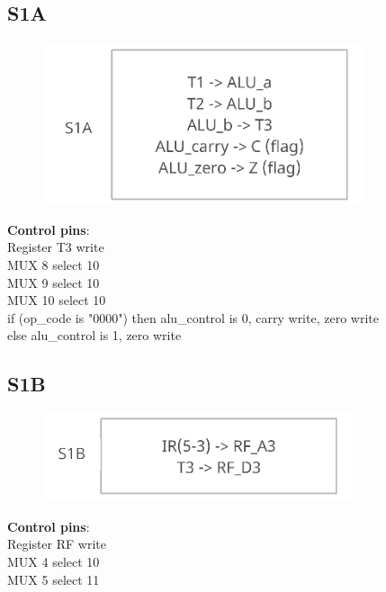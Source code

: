 \documentclass[11pt, fleqn]{article}
\begin{document}
\bigskip

\subsection*{\centering S1A}
\begin{figure}[H]
    \centering
    \includegraphics{DataPath/DataPath_S1A.PNG}
\end{figure}
\begin{center}
\textbf{Control pins}: \\
Register T3 write \\
MUX 8 select 10 \\
MUX 9 select 10 \\
MUX 10 select 10 \\
if (op\_code is "0000") then alu\_control is 0, carry write, zero write \\
else alu\_control is 1, zero write \\
\end{center}

\bigskip

\subsection*{\centering S1B}
\begin{figure}[H]
    \centering
    \includegraphics{DataPath/DataPath_S1B.PNG}
\end{figure}
\begin{center}
\textbf{Control pins}: \\
Register RF write \\
MUX 4 select 10 \\
MUX 5 select 11 \\
\end{center}
\end{document}
